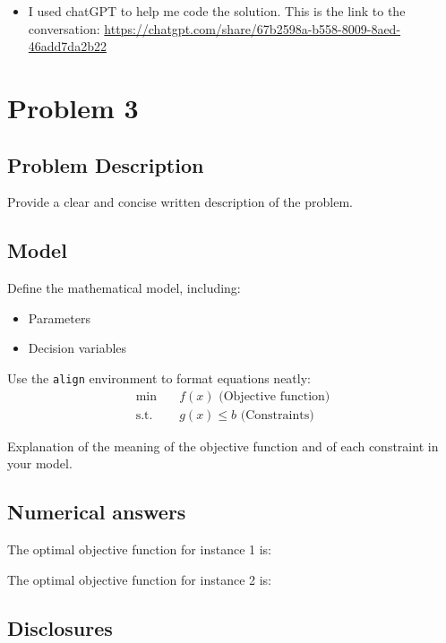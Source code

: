 \documentclass[a4paper,12pt]{article}
\begin{document}
\begin{itemize}
    \item I used chatGPT to help me code the solution. This is the link to the conversation: \href{https://chatgpt.com/share/67b2598a-b558-8009-8aed-46add7da2b22}{https://chatgpt.com/share/67b2598a-b558-8009-8aed-46add7da2b22}
\end{itemize}

\newpage


\section{Problem 3}

\subsection{Problem Description}
Provide a clear and concise written description of the problem.

\subsection{Model}
Define the mathematical model, including:
\begin{itemize}
    \item Parameters
    \item Decision variables
\end{itemize}
Use the \texttt{align} environment to format equations neatly:
\begin{align}
    \min \quad & f(x) \text{ (Objective function)} \\
    \text{s.t.} \quad & g(x) \leq b \text{ (Constraints)}
\end{align}

Explanation of the meaning of the objective function and of each constraint in your model.

\subsection{Numerical answers}

The optimal objective function for instance 1 is: 

\noindent The optimal objective function for instance 2 is: 



\subsection{Disclosures}
\end{document}

